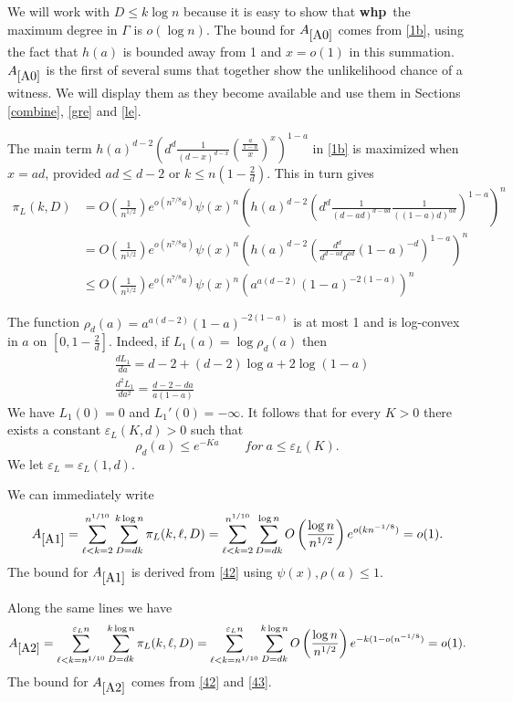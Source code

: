 \documentclass[11pt]{article}
\def\e{\varepsilon}
\def\G{\Gamma}
\def\p{\pi}
\def\r{\rho}
\def\whp{{\bf whp}}
\newcommand{\brac}[1]{\left(#1\right)}
\newcommand{\bfrac}[2]{\brac{\frac{#1}{#2}}}
\newcommand{\beq}[1]{\begin{equation}\label{#1}}
\newcommand{\eeq}{\end{equation}}
\begin{document}
We will work with $D\leq k\log n$ because it is easy to show that \whp\ the maximum degree in $\G$ is $o(\log n)$.
The bound for $A_{\ref{A0}}$ comes 
from \eqref{1b}, using the fact that $h(a)$ is bounded away from 1 and $x=o(1)$ in this summation.
$A_{\ref{A0}}$ is the first of several sums that 
together show the unlikelihood chance of a witness. We will display them as they
become available and use them in Sections \ref{combine}, \ref{gre} and \ref{le}.

The main term $h(a)^{d-2}\brac{d^d\frac{1}{(d-x)^{d-x}}\bfrac{\frac{a}{1-a}}{x}^x}^{1-a}$ 
in \eqref{1b} is maximized when $x = ad$, provided $ad\leq d-2$ or $k\leq n\brac{1-\frac{2}{d}}$. This in turn gives
\begin{align}
\p_L(k,D)&=O\bfrac{1}{n^{1/2}}e^{o(n^{7/8}a)}\psi(x)^n
\brac{h(a)^{d-2}\brac{d^d\frac{1}{(d-ad)^{d-ad}}\frac{1}{((1-a)d)^{ad}}}^{1-a}}^n\nonumber\\
&=O\bfrac{1}{n^{1/2}}e^{o(n^{7/8}a)}\psi(x)^n
\brac{h(a)^{d-2}\brac{\frac{d^{d}}{d^{d-ad}d^{ad}}(1-a)^{-d}}^{1-a}}^n\nonumber\\
&\leq O\bfrac{1}{n^{1/2}}e^{o(n^{7/8}a)}\psi(x)^n\brac{a^{a(d-2)}(1-a)^{-2(1-a)}}^n\label{42}
\end{align}

The function $\r_d(a)=a^{a(d-2)}(1-a)^{-2(1-a)}$ is at most 1 and is log-convex in $a$ on $[0,1-\frac{2}{d}]$. 
Indeed, if $L_1(a)=\log\r_d(a)$ then
\begin{align}
&\frac{dL_1}{da}=d-2+(d-2)\log a+2\log(1-a)\label{k1}\\
&\frac{d^2L_1}{da^2}=\frac{d-2-da}{a(1-a)}\label{k2}
\end{align}
We have $L_1(0)=0$ and $L_1'(0)=-\infty$. It follows that for every $K>0$ there exists a constant $\e_L(K,d)>0$ such that 
\beq{43}
\r_d(a)\leq e^{-Ka}\qquad for\ a\leq \e_L(K).
\eeq 
We let $\e_L=\e_L(1,d)$.

We can immediately write
\beq{A1}
A_{\ref{A1}}=\sum_{\ell<k=2}^{n^{1/10}}\sum_{D=dk}^{k\log n}\p_L(k,\ell,D)=
\sum_{\ell<k=2}^{n^{1/10}}\sum_{D=dk}^{\log n}O\bfrac{\log n}{n^{1/2}}e^{o(kn^{-1/8})}=o(1).
\eeq
The bound for $A_{\ref{A1}}$ is derived from \eqref{42} using $\psi(x),\r(a)\leq 1$. 

Along the same lines we have
\beq{A2}
A_{\ref{A2}}=\sum_{\ell<k=n^{1/10}}^{\e_Ln}\sum_{D=dk}^{k\log n}\p_L(k,\ell,D)=
\sum_{\ell<k=n^{1/10}}^{\e_Ln}\sum_{D=dk}^{k\log n}O\bfrac{\log n}{n^{1/2}}
e^{-k(1-o(n^{-1/8})}=o(1).
\eeq
The bound for $A_{\ref{A2}}$
comes from \eqref{42} and \eqref{43}. 
\end{document}

